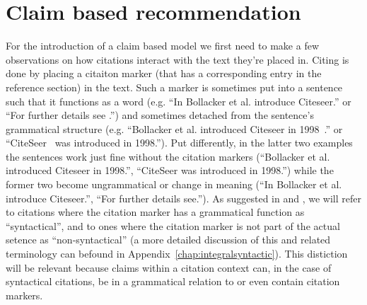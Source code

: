 \section{Claim based recommendation}
For the introduction of a claim based model we first need to make a few observations on how citations interact with the text they're placed in. Citing is done by placing a citaiton marker (that has a corresponding entry in the reference section) in the text. Such a marker is sometimes put into a sentence such that it functions as a word (e.g. ``In \cite{Bollacker1998} Bollacker et al. introduce Citeseer.'' or ``For further details see \cite{Bollacker1998}.'') and sometimes detached from the sentence's grammatical structure (e.g. ``Bollacker et al. introduced Citeseer in 1998~\cite{Bollacker1998}.'' or ``CiteSeer~\cite{Bollacker1998} was introduced in 1998.''). Put differently, in the latter two examples the sentences work just fine without the citation markers (``Bollacker et al. introduced Citeseer in 1998.'', ``CiteSeer was introduced in 1998.'') while the former two become ungrammatical or change in meaning (``In Bollacker et al. introduce Citeseer.'', ``For further details see.''). As suggested in \cite{Whidby2011} and \cite{Abujbara2012}, we will refer to citations where the citation marker has a grammatical function as ``syntactical'', and to ones where the citation marker is not part of the actual setence as ``non-syntactical''  (a more detailed discussion of this and related terminology can befound in Appendix~\ref{chap:integralsyntactic}). This distiction will be relevant because claims within a citation context can, in the case of syntactical citations, be in a grammatical relation to or even contain citation markers.

